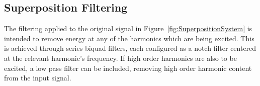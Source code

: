 \begin{appendices}
	\section{Superposition Filtering}
		The filtering applied to the original signal in Figure~\ref{fig:SuperpositionSystem} is intended to remove
		energy at any of the harmonics which are being excited. This is achieved through series biquad filters, each
		configured as a notch filter centered at the relevant harmonic's frequency. If high order harmonics are also
		to be excited, a low pass filter can be included, removing high order harmonic content from the input
		signal.

\end{appendices}
